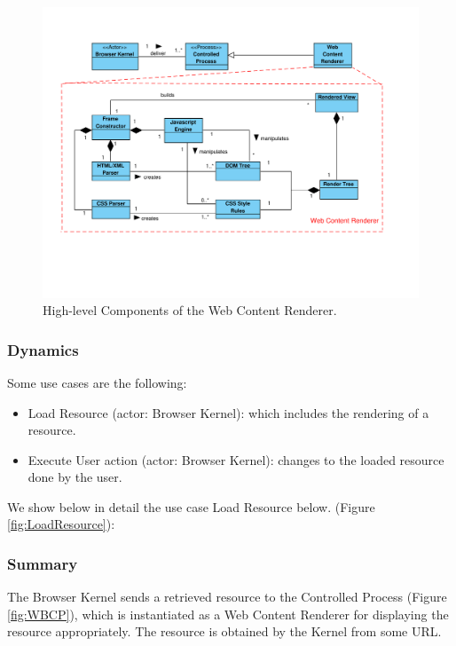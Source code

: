 \documentclass[prodmode,acmtecs]{acmsmall}
\begin{document}
    \begin{figure}[h!t]
      \vspace*{-1.5cm}
      \centering
      \hspace*{-0.4cm}\includegraphics[scale=0.57]{figures/WebContentRenderer-v4.pdf}
      \vspace*{-3cm}
      \caption{High-level Components of the Web Content Renderer.}
      \label{fig:WCR}
    \end{figure}

    \subsubsection*{Dynamics}
    Some use cases are the following:
    \begin{itemize}\leftskip2.5em
      \item Load Resource (actor: Browser Kernel): which includes the rendering of a resource.

      \item Execute User action (actor: Browser Kernel): changes to the loaded resource done by the user.

    \end{itemize}
    We show below in detail the use case Load Resource below. (Figure \ref{fig:LoadResource}):
    \subsubsection*{Summary} The Browser Kernel sends a retrieved resource to the Controlled Process (Figure \ref{fig:WBCP}), which is instantiated as a Web Content Renderer for displaying the resource appropriately. The resource is obtained by the Kernel from some URL.
\end{document}
